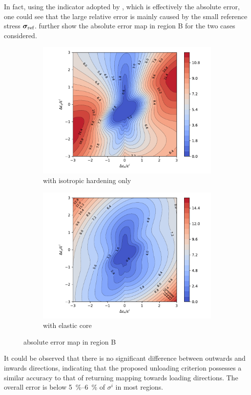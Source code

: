 In fact, using the indicator adopted by \citet{Anjiki2019}, which is effectively the absolute error, one could see that the large relative error is mainly caused by the small reference stress $\bm{\sigma}_\text{ref}$.
 further show the absolute error map in region B for the two cases considered.
\begin{figure}[htb]
    \centering
    \begin{subfigure}{.48\textwidth}\centering
        \includegraphics[width=.99\textwidth]{PIC/ISOMAP/abs.error.iso.uniaxial.pdf}
        \caption{with isotropic hardening only}\label{fig:abs_error_euler_with_iso}
    \end{subfigure}\hfill
    \begin{subfigure}{.48\textwidth}\centering
        \includegraphics[width=.99\textwidth]{PIC/ISOMAP/abs.error.core.uniaxial.pdf}
        \caption{with elastic core}\label{fig:abs_error_euler_with_core}
    \end{subfigure}
    \caption{absolute error map in region B}\label{fig:abs_error}
\end{figure}
It could be observed that there is no significant difference between outwards and inwards directions, indicating that the proposed unloading criterion possesses a similar accuracy to that of returning mapping towards loading directions.
The overall error is below \SIrange{5}{6}{\percent} of $\sigma^i$ in most regions.
